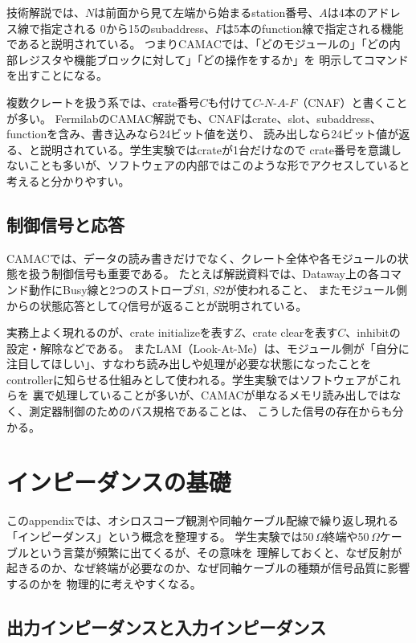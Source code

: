 \documentclass[uplatex,dvipdfmx,12pt,nomag]{jsarticle}
\begin{document}
技術解説では、$N$は前面から見て左端から始まるstation番号、$A$は4本のアドレス線で指定される
0から15のsubaddress、$F$は5本のfunction線で指定される機能であると説明されている\cite{camac-intro}。
つまりCAMACでは、「どのモジュールの」「どの内部レジスタや機能ブロックに対して」「どの操作をするか」を
明示してコマンドを出すことになる。

複数クレートを扱う系では、crate番号$C$も付けて$C$-$N$-$A$-$F$（CNAF）と書くことが多い\cite{fermilab-camac}。
FermilabのCAMAC解説でも、CNAFはcrate、slot、subaddress、functionを含み、書き込みなら24ビット値を送り、
読み出しなら24ビット値が返る、と説明されている\cite{fermilab-camac}。学生実験ではcrateが1台だけなので
crate番号を意識しないことも多いが、ソフトウェアの内部ではこのような形でアクセスしていると考えると分かりやすい。

\subsection{制御信号と応答}

CAMACでは、データの読み書きだけでなく、クレート全体や各モジュールの状態を扱う制御信号も重要である。
たとえば解説資料では、Dataway上の各コマンド動作にBusy線と2つのストローブ$S1$, $S2$が使われること、
またモジュール側からの状態応答として$Q$信号が返ることが説明されている\cite{camac-intro}。

実務上よく現れるのが、crate initializeを表す$Z$、crate clearを表す$C$、inhibitの設定・解除などである。
またLAM（Look-At-Me）は、モジュール側が「自分に注目してほしい」、すなわち読み出しや処理が必要な状態になったことを
controllerに知らせる仕組みとして使われる\cite{camac-intro}。学生実験ではソフトウェアがこれらを
裏で処理していることが多いが、CAMACが単なるメモリ読み出しではなく、測定器制御のためのバス規格であることは、
こうした信号の存在からも分かる。

\section{インピーダンスの基礎}

このappendixでは、オシロスコープ観測や同軸ケーブル配線で繰り返し現れる「インピーダンス」という概念を整理する。
学生実験では50\,$\Omega$終端や50\,$\Omega$ケーブルという言葉が頻繁に出てくるが、その意味を
理解しておくと、なぜ反射が起きるのか、なぜ終端が必要なのか、なぜ同軸ケーブルの種類が信号品質に影響するのかを
物理的に考えやすくなる。

\subsection{出力インピーダンスと入力インピーダンス}
\end{document}
